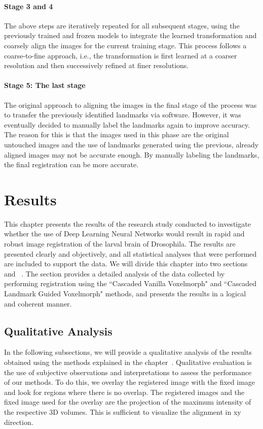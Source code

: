 \documentclass{book}
\begin{document}
	\subsubsection{Stage 3 and 4}
	The above steps are iteratively repeated for all subsequent stages, using the previously trained and frozen models to integrate the learned transformation and coarsely align the images for the current training stage. This process follows a coarse-to-fine approach, i.e., the transformation is first learned at a coarser resolution and then successively refined at finer resolutions.
	
	\subsubsection{Stage 5: The last stage}
	The original approach to aligning the images in the final stage of the process was to transfer the previously identified landmarks via software. However, it was eventually decided to manually label the landmarks again to improve accuracy. The reason for this is that the images used in this phase are the original untouched images and the use of landmarks generated using the previous, already aligned images may not be accurate enough. By manually labeling the landmarks, the final registration can be more accurate.
	
	\chapter{Results}\label{chapter:results}
	This chapter presents the results of the research study conducted to investigate whether the use of Deep Learning Neural Networks would result in rapid and robust image registration of the larval brain of Drosophila. The results are presented clearly and objectively, and all statistical analyses that were performed are included to support the data. We will divide this chapter into two sections ~ and ~. The  section provides a detailed analysis of the data collected by performing registration using the ``Cascaded Vanilla Voxelmorph" and ``Cascaded Landmark Guided Voxelmorph" methods, and presents the results in a logical and coherent manner.
	
	\section{Qualitative Analysis} \label{sec:Qualitative}
	In the following subsections, we will provide a qualitative analysis of the results obtained using the methods explained in the chapter~. Qualitative evaluation is the use of subjective observations and interpretations to assess the performance of our methods. To do this, we overlay the registered image with the fixed image and look for regions where there is no overlap. The registered images and the fixed image used for the overlay are the projection of the maximum intensity of the respective 3D volumes. This is sufficient to visualize the alignment in xy direction.
	
\end{document}
